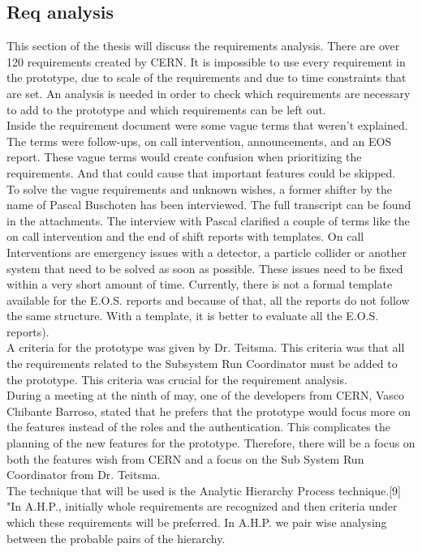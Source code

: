 \documentclass[paper=a4, fontsize=11pt,twoside]{scrartcl}	%
\begin{document}
\subsection{Req analysis}
This section of the thesis will discuss the requirements analysis. There are over 120 requirements created by CERN. It is impossible to use every requirement in the prototype, due to scale of the requirements and due to time constraints that are set. An analysis is needed in order to check which requirements are necessary to add to the prototype and which requirements can be left out.  \\
Inside the requirement document were some vague terms that weren't explained. The terms were follow-ups, on call intervention, announcements, and an EOS report. These vague terms would create confusion when prioritizing the requirements. And that could cause that important features could be skipped. \\
To solve the vague requirements and unknown wishes, a former shifter by the name of Pascal Buschoten has been interviewed. The full transcript can be found in the attachments. The interview with Pascal clarified a couple of terms like the on call intervention and the end of shift reports with templates. On call Interventions are emergency issues with a detector, a particle collider or another system that need to be solved as soon as possible. These issues need to be fixed within a very short amount of time. Currently, there is not a formal template available for the E.O.S. reports  and because of that, all the reports do not follow the same structure. With a template, it is better to evaluate all the E.O.S. reports).\\
A criteria for the prototype was given by Dr. Teitsma. This criteria was that all the requirements related to the Subsystem Run Coordinator must be added to the prototype. This criteria was crucial for the requirement analysis. \\
During a meeting at the ninth of may, one of the developers from CERN, Vasco Chibante Barroso, stated that he prefers that the prototype would focus more on the features instead of the roles and the authentication. This complicates the planning of the new features for the prototype. Therefore, there will be a focus on both the features wish from CERN and a focus on the Sub System Run Coordinator from Dr. Teitsma. \\ 
The technique that will be used is the Analytic Hierarchy Process technique.[9] "In A.H.P., initially whole requirements are recognized and then criteria under which these requirements will be preferred. In A.H.P. we pair wise analysing  between  the  probable  pairs  of  the  hierarchy. 
\end{document}
